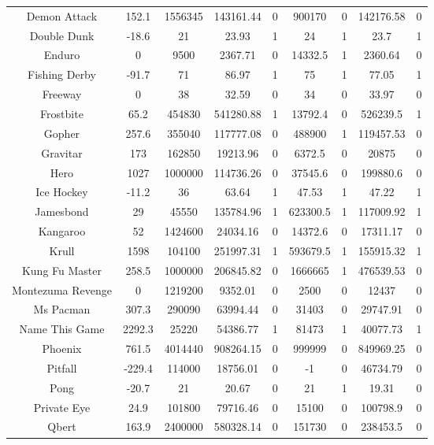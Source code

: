 \begin{table}[!hb]
\begin{center}
\begin{tabular}{c cc cc cc cc}
        Demon Attack & 152.1 & 1556345 & 143161.44 & 0  & 900170 & 0 & 142176.58	&0 \\  
        Double Dunk & -18.6 & 21 & 23.93 & 1  & 24 & 1 &23.7	&1 \\  
        Enduro & 0 & 9500 & 2367.71 & 0  & 14332.5 & 1  &2360.64	&0\\  
        Fishing Derby & -91.7 & 71 & 86.97 & 1  & 75 & 1  & 77.05	&1\\  
        Freeway & 0 & 38 & 32.59 & 0  & 34 & 0  & 33.97	& 0\\  
        Frostbite & 65.2 & 454830 & 541280.88 & 1  & 13792.4 & 0  & 526239.5	& 1\\  
        Gopher & 257.6 & 355040 & 117777.08 & 0  & 488900 & 1 & 119457.53	& 0 \\  
        Gravitar & 173 & 162850 & 19213.96 & 0  & 6372.5 & 0  & 20875	& 0\\  
        Hero & 1027 & 1000000 & 114736.26 & 0  & 37545.6 & 0  & 199880.6	& 0\\  
        Ice Hockey & -11.2 & 36 & 63.64 & 1  & 47.53 & 1  & 47.22	& 1\\  
        Jamesbond & 29 & 45550 & 135784.96 & 1  & 623300.5 & 1  & 117009.92	& 1\\  
        Kangaroo & 52 & 1424600 & 24034.16 & 0  & 14372.6 & 0  & 17311.17	& 0\\  
        Krull & 1598 & 104100 & 251997.31 & 1  & 593679.5 & 1  & 155915.32	& 1\\  
        Kung Fu Master & 258.5 & 1000000 & 206845.82 & 0  & 1666665 & 1  & 476539.53	& 0\\  
        Montezuma Revenge & 0 & 1219200 & 9352.01 & 0  & 2500 & 0 & 12437	& 0 \\  
        Ms Pacman & 307.3 & 290090 & 63994.44 & 0  & 31403 & 0  & 29747.91	& 0 \\  
        Name This Game & 2292.3 & 25220 & 54386.77 & 1  & 81473 & 1 & 40077.73	& 1 \\  
        Phoenix & 761.5 & 4014440 & 908264.15 & 0  & 999999 & 0  & 849969.25	& 0\\  
        Pitfall & -229.4 & 114000 & 18756.01 & 0  & -1 & 0 & 46734.79	& 0 \\  
        Pong & -20.7 & 21 & 20.67 & 0  & 21 & 1  & 19.31	& 0\\  
        Private Eye & 24.9 & 101800 & 79716.46 & 0  & 15100 & 0 & 100798.9	& 0 \\  
        Qbert & 163.9 & 2400000 & 580328.14 & 0  & 151730 & 0  & 238453.5	& 0\\  

\end{tabular}
\end{center}
\end{table}
